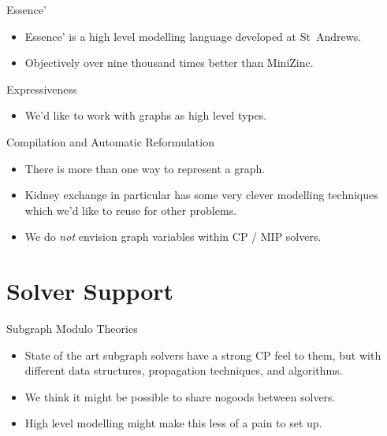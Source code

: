 \documentclass{beamer}
\begin{document}
\begin{frame}{Essence'}
    \begin{itemize}
        \item Essence' is a high level modelling language developed at St~Andrews.
        \item Objectively over nine thousand times better than MiniZinc.
    \end{itemize}
\end{frame}

\begin{frame}{Expressiveness}
    \begin{itemize}
        \item We'd like to work with graphs as high level types.
    \end{itemize}
\end{frame}

\begin{frame}{Compilation and Automatic Reformulation}
    \begin{itemize}
        \item There is more than one way to represent a graph.
        \item Kidney exchange in particular has some very clever modelling techniques which we'd
            like to reuse for other problems.
        \item We do \emph{not} envision graph variables within CP / MIP solvers.
    \end{itemize}
\end{frame}

\section{Solver Support}

\begin{frame}{Subgraph Modulo Theories}
    \begin{itemize}
        \item State of the art subgraph solvers have a strong CP feel to them, but with different
            data structures, propagation techniques, and algorithms.

        \item We think it might be possible to share nogoods between solvers.

        \item High level modelling might make this less of a pain to set up.
    \end{itemize}
\end{frame}
\end{document}
